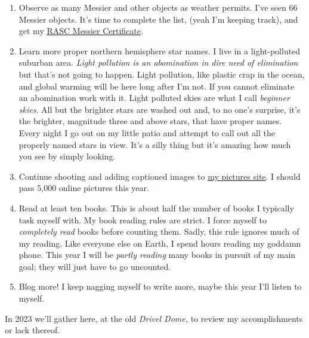 \begin{enumerate}
\item
  Observe as many Messier and other objects as weather permits. I've
  seen 66 Messier objects. It's time to complete the list, (yeah I'm
  keeping track), and get my
  \href{https://www.rasc.ca/observing/messier-certificate}{RASC Messier
  Certificate}.
\item
  Learn more proper northern hemisphere star names. I live in a
  light-polluted suburban area. \emph{Light pollution is an abomination
  in dire need of elimination} but that's not going to happen. Light
  pollution, like plastic crap in the ocean, and global warming will be
  here long after I'm not. If you cannot eliminate an abomination work
  with it. Light polluted skies are what I call \emph{beginner skies}.
  All but the brighter stars are washed out and, to no one's surprise,
  it's the brighter, magnitude three and above stars, that have proper
  names. Every night I go out on my little patio and attempt to call out
  all the properly named stars in view. It's a silly thing but it's
  amazing how much you see by simply looking.
\item
  Continue shooting and adding captioned images to
  \href{https://conceptcontrol.smugmug.com/}{my pictures site}. I should
  pass 5,000 online pictures this year.
\item
  Read at least ten books. This is about half the number of books I
  typically task myself with. My book reading rules are strict. I force
  myself to \emph{completely read} books before counting them. Sadly,
  this rule ignores much of my reading. Like everyone else on Earth, I
  spend hours reading my goddamn phone. This year I will be \emph{partly
  reading} many books in pursuit of my main goal; they will just have to
  go uncounted.
\item
  Blog more! I keep nagging myself to write more, maybe this year I'll
  listen to myself.
\end{enumerate}

In 2023 we'll gather here, at the old \emph{Drivel Dome,} to review my
accomplishments or lack thereof.



%

